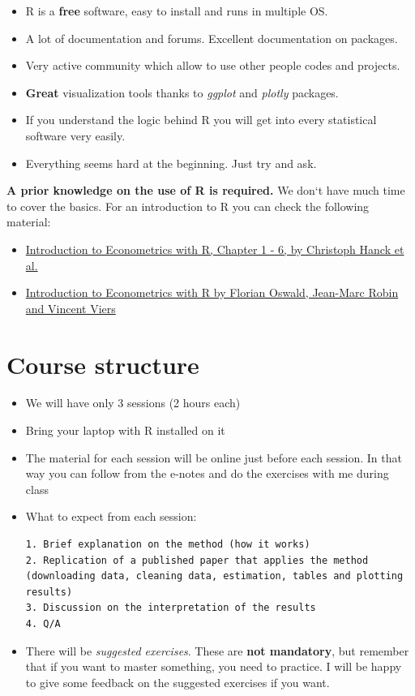 \documentclass[]{book}
\providecommand{\tightlist}{%
  \setlength{\itemsep}{0pt}\setlength{\parskip}{0pt}}
\begin{document}
\begin{itemize}
\item
  R is a \textbf{free} software, easy to install and runs in multiple
  OS.
\item
  A lot of documentation and forums. Excellent documentation on
  packages.
\item
  Very active community which allow to use other people codes and
  projects.
\item
  \textbf{Great} visualization tools thanks to \emph{ggplot} and
  \emph{plotly} packages.
\item
  If you understand the logic behind R you will get into every
  statistical software very easily.
\item
  Everything seems hard at the beginning. Just try and ask.
\end{itemize}

\textbf{A prior knowledge on the use of R is required.} We don`t have
much time to cover the basics. For an introduction to R you can check
the following material:

\begin{itemize}
\tightlist
\item
  \href{https://www.econometrics-with-r.org/1-1-a-very-short-introduction-to-r-and-rstudio.html}{Introduction
  to Econometrics with R, Chapter 1 - 6, by Christoph Hanck et al.}
\item
  \href{https://scpoecon.github.io/ScPoEconometrics/R-intro.html}{Introduction
  to Econometrics with R by Florian Oswald, Jean-Marc Robin and Vincent
  Viers}
\end{itemize}

\section{Course structure}\label{course-structure}

\begin{itemize}
\item
  We will have only 3 sessions (2 hours each)
\item
  Bring your laptop with R installed on it
\item
  The material for each session will be online just before each session.
  In that way you can follow from the e-notes and do the exercises with
  me during class
\item
  What to expect from each session:

\begin{verbatim}
1. Brief explanation on the method (how it works)
2. Replication of a published paper that applies the method (downloading data, cleaning data, estimation, tables and plotting results)
3. Discussion on the interpretation of the results
4. Q/A
\end{verbatim}
\item
  There will be \emph{suggested exercises}. These are \textbf{not
  mandatory}, but remember that if you want to master something, you
  need to practice. I will be happy to give some feedback on the
  suggested exercises if you want.
\end{itemize}
\end{document}
